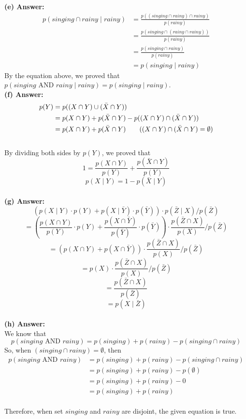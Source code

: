 \documentclass{article}
\begin{document}
\noindent
\textbf{(e) Answer:}\\
\begin{align*}
  p(singing \cap rainy \mid rainy)
  &= \frac{p((singing \cap rainy) \cap rainy)}{p(rainy)}
  \\&= \frac{p(singing \cap (rainy \cap rainy))}{p(rainy)}  \tag{Intersection is an associative operation}
  \\ &= \frac{p(singing \cap rainy)}{p(rainy)}  \tag{$rainy \cap rainy = rainy$}    
  \\ &= p(singing \mid rainy)      
\end{align*}
By the equation above, we proved that $p(singing \text{ AND } rainy \mid rainy) = p(singing \mid rainy)$.
\\

\noindent
\textbf{(f) Answer:}\\
\begin{align*}
  p(Y)
  &= p((X \cap Y) \cup (\bar{X} \cap Y))
  \\&= p(X \cap Y) + p(\bar{X} \cap Y) - p((X \cap Y) \cap (\bar{X} \cap Y))  
  \\ &= p(X \cap Y) + p(\bar{X} \cap Y)     \tag{$(X \cap Y) \cap (\bar{X} \cap Y) = \emptyset$}
\end{align*}\\
By dividing both sides by $p(Y)$, we proved that\\
$$1 = \frac{p(X \cap Y)}{p(Y)} + \frac{p(\bar{X} \cap Y)}{p(Y)}$$
$$p(X \mid Y) = 1 - p(\bar{X} \mid Y)$$
\\

\noindent
\textbf{(g) Answer:}\\
$$(p(X \mid Y)\cdot p(Y) + p(X \mid \bar{Y}) \cdot p(\bar{Y})) \cdot p(\bar{Z} \mid X) / p(\bar{Z})$$
%
$$= (\frac{p(X \cap Y)}{p(Y)} \cdot p(Y) + \frac{p(X \cap \bar{Y})}{p(\bar{Y})} \cdot p(\bar{Y})) \cdot \frac{p(\bar{Z} \cap X)}{p(X)}/p(\bar{Z})$$
%
$$= (p(X \cap Y) + p(X \cap \bar{Y})) \cdot \frac{p(\bar{Z} \cap X)}{p(X)}/p(\bar{Z})$$
%
$$= p(X) \cdot \frac{p(\bar{Z} \cap X)}{p(X)}/p(\bar{Z})$$
%
$$= \frac{p(\bar{Z} \cap X)}{p(\bar{Z})}$$
% 
$$= p(X \mid \bar{Z})$$
\\

\noindent
\textbf{(h) Answer:}\\
We know that 
$$p(singing \text{ AND } rainy) = p(singing) + p(rainy) - p(singing \cap rainy)$$
So, when $(singing \cap rainy) = \emptyset$, then  
\begin{align*}
  p(singing \text{ AND } rainy)
  &= p(singing) + p(rainy) - p(singing \cap rainy)
  \\&= p(singing) + p(rainy) - p(\emptyset)
  \\ &= p(singing) + p(rainy) - 0     \tag{by (c)}
  \\ &= p(singing) + p(rainy)
\end{align*}\\
Therefore, when set $singing$ and $rainy$ are disjoint, the given equation is true.\\
\end{document}
